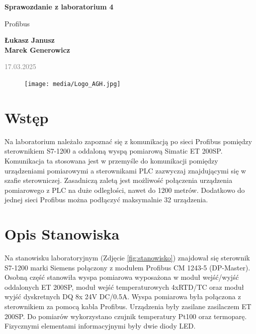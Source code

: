 \documentclass{article}
\begin{document}
\begin{titlepage}
    \begin{center}
        \vspace*{1cm}
            
        \Huge
        \textbf{Sprawozdanie z laboratorium 4}
            
        \vspace{0.5cm}
        \LARGE
        Profibus 
            
        \vspace{1.5cm}
            
        \textbf{Łukasz Janusz\\Marek Generowicz}

        \normalsize      
        \textcolor{gray}{17.03.2025}
        \vfill
        \begin{figure}[hb]
            \centering
            \texttt{[image: media/Logo\_AGH.jpg]}
        \end{figure}   
    \end{center}
\end{titlepage}

\section{Wstęp}
Na laboratorium należało zapoznać się z komunikacją po sieci Profibus pomiędzy sterownikiem S7-1200 a oddaloną wyspą pomiarową Simatic ET 200SP. Komunikacja ta stosowana jest w przemyśle do komunikacji pomiędzy urządzeniami pomiarowymi a sterownikami PLC zazwyczaj znajdującymi się w szafie sterowniczej. Zasadniczą zaletą jest możliwość połączenia urządzenia pomiarowego z PLC na duże odległości, nawet do 1200 metrów. Dodatkowo do jednej sieci Profibus można podłączyć maksymalnie 32 urządzenia.

\section{Opis Stanowiska}
Na stanowisku laboratoryjnym (Zdjęcie \ref{fig:stanowisko}) znajdował się sterownik S7-1200 marki Siemens połączony z modułem Profibus CM 1243-5 (DP-Master). Osobną część stanowiła wyspa pomiarowa wyposażona w moduł wejść/wyjść oddalonych ET 200SP, moduł wejść temperaturowych 4xRTD/TC oraz moduł wyjść dyskretnych DQ 8x 24V DC/0.5A. Wyspa pomiarowa była połączona z sterownikiem za pomocą kabla Profibus. Urządzenia były zasilane zasilaczem ET 200SP. Do pomiarów wykorzystano czujnik temperatury Pt100 oraz termoparę. Fizycznymi elementami informacyjnymi były dwie diody LED.  
\end{document}

